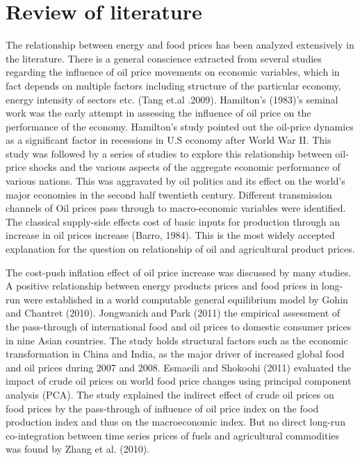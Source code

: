 \documentclass[a4paper,12pt]{article}
\begin{document}
\section{Review of literature}
The relationship between energy and food prices has been analyzed extensively in the literature. 
There is a general conscience extracted from several studies regarding the influence of oil price movements on economic variables, which in fact depends on multiple factors including structure of the particular economy, energy intensity of sectors etc. (Tang et.al .2009). Hamilton's (1983)’s seminal work was the early attempt in assessing the influence of oil price on the performance of the economy. Hamilton’s study pointed out the oil-price dynamics as a significant factor in recessions in U.S economy after World War II. This study was followed by a series of studies to explore this relationship between oil-price shocks and the various aspects of the aggregate economic performance of various nations. This was aggravated by oil politics and its effect on the world’s major economies in the second half twentieth century. Different transmission channels of Oil prices pass through to macro-economic variables were identified. The classical supply-side effects cost of basic inputs for production through an increase in oil prices increase (Barro, 1984). This is the most widely accepted explanation for the question on relationship of oil and agricultural product prices.

The cost-push inflation effect of oil price increase was discussed by many studies. A positive relationship between energy products prices and food prices in long-run were established in a world computable general equilibrium model by Gohin and Chantret (2010). Jongwanich and Park (2011) the empirical assessment of the pass-through of international food and oil prices to domestic consumer prices in nine Asian countries. The study holds structural factors such as the economic transformation in China and India, as the major driver of increased global food and oil prices during 2007 and 2008. Esmaeili and Shokoohi (2011) evaluated the impact of crude oil prices on world food price changes using principal component analysis (PCA). The study explained the indirect effect of crude oil prices on food prices by the pass-through of influence of oil price index on the food production index and thus on the macroeconomic index.  But no direct long-run co-integration between time series prices of fuels and agricultural commodities was found by Zhang et al. (2010).
\end{document}

